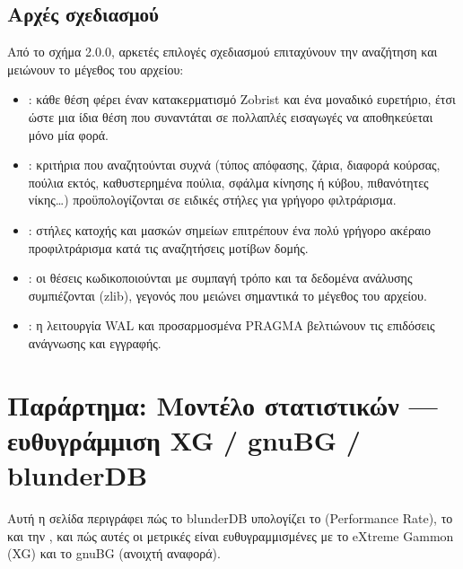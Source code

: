 \documentclass[letterpaper,10pt,greek]{sphinxmanual}
\begin{document}
\subsection{Αρχές σχεδιασμού}
\label{\detokenize{annexe_db_scheme:principes-de-conception}}
\sphinxAtStartPar
Από το σχήμα 2.0.0, αρκετές επιλογές σχεδιασμού επιταχύνουν την αναζήτηση και μειώνουν το μέγεθος του αρχείου:
\begin{itemize}
\item {} 
\sphinxAtStartPar
{}: κάθε θέση φέρει έναν κατακερματισμό Zobrist και ένα μοναδικό ευρετήριο, έτσι ώστε μια ίδια θέση που συναντάται σε πολλαπλές εισαγωγές να αποθηκεύεται μόνο μία φορά.

\item {} 
\sphinxAtStartPar
{}: κριτήρια που αναζητούνται συχνά (τύπος απόφασης, ζάρια, διαφορά κούρσας, πούλια εκτός, καθυστερημένα πούλια, σφάλμα κίνησης ή κύβου, πιθανότητες νίκης…) προϋπολογίζονται σε ειδικές στήλες για γρήγορο φιλτράρισμα.

\item {} 
\sphinxAtStartPar
{}: στήλες κατοχής και μασκών σημείων επιτρέπουν ένα πολύ γρήγορο ακέραιο προφιλτράρισμα κατά τις αναζητήσεις μοτίβων δομής.

\item {} 
\sphinxAtStartPar
{}: οι θέσεις κωδικοποιούνται με συμπαγή τρόπο και τα δεδομένα ανάλυσης συμπιέζονται (zlib), γεγονός που μειώνει σημαντικά το μέγεθος του αρχείου.

\item {} 
\sphinxAtStartPar
{}: η λειτουργία WAL και προσαρμοσμένα PRAGMA βελτιώνουν τις επιδόσεις ανάγνωσης και εγγραφής.

\end{itemize}

\sphinxstepscope


\section{Παράρτημα: Μοντέλο στατιστικών — ευθυγράμμιση XG / gnuBG / blunderDB}
\label{\detokenize{stats_parity:annexe-modele-de-statistiques-alignement-xg-gnubg-blunderdb}}\label{\detokenize{stats_parity:stats-parity}}\label{\detokenize{stats_parity::doc}}
\sphinxAtStartPar
Αυτή η σελίδα περιγράφει πώς το blunderDB υπολογίζει το  (Performance Rate), το  και την , και πώς αυτές οι μετρικές είναι ευθυγραμμισμένες με το eXtreme Gammon (XG) και το gnuBG (ανοιχτή αναφορά).
\end{document}
